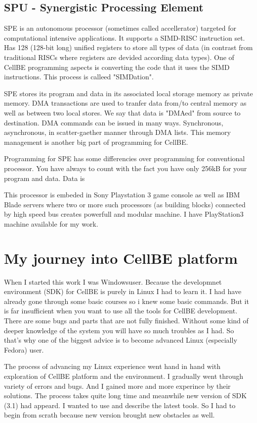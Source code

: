 \subsection{SPU - Synergistic Processing Element}
SPE is an autonomous processor (sometimes called accellerator) targeted for computational intensive applications. It supports a SIMD-RISC instruction set. Has 128 (128-bit long) unified registers to store all types of data (in contrast from traditional RISCs where registers are devided according data types). One of CellBE programming aspects is converting the code that it uses the SIMD instructions. This process is calleed "SIMDation".

SPE stores its program and data in its associated local storage memory as private memory. DMA transactions are used to tranfer data from/to central memory as well as between two local stores. We say that data is "DMAed" from source to destination. DMA commands can be issued in many ways. Synchronous, asynchronous, in scatter-gaether manner through DMA lists. This memory management is another big part of programming for CellBE.

Programming for SPE has some differencies over programming for conventional processor. You have always to count with the fact you have only 256kB for your program and data. Data is 

This processor is embeded in Sony Playstation 3 game console as well as IBM Blade servers where two or more such processors (as building blocks) connected by high speed bus creates powerfull and modular machine. I have PlayStation3 machine available for my work.

\section{My journey into CellBE platform}
When I started this work I was Windows\textregistered user. Because the developmnet environment (SDK) for CellBE is purely in Linux I had to learn it. I had have already gone through some basic courses so i knew some basic commands. But it is far insufficient when you want to use all the tools for CellBE development. There are some bugs and parts that are not fully finished. Without some kind of deeper knowledge of the system you will have so much troubles as I had. So that's why one of the biggest advice is to become advanced Linux (especially Fedora) user.

The process of advancing my Linux experience went hand in hand with exploration of CellBE platform and the environment. I gradually went through variety of errors and bugs. And I gained more and more experince by their solutions. The process takes quite long time and meanwhile new version of SDK (3.1) had appeard. I wanted to use and describe the latest tools. So I had to begin from scrath because new version brought new obstacles as well.

